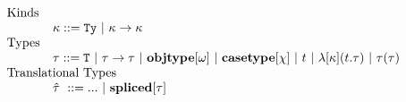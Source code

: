 \begin{figure}[ht]
\[
	\begin{array}{llcl}
      \text{Kinds}\\
      ~~~~~~~~~~~	\kappa ::=  \mathtt{Ty}  ~|~ \kappa \rightarrow \kappa\\
      \text{Types}\\
      ~~~~~~~~~~~	 \tau  ::=  \mathtt{T} ~|~ \tau \rightarrow \tau ~|~ \mathbf{objtype}[\omega] ~|~ \mathbf{casetype}[\chi] ~|~  t ~|~ \lambda[\kappa](t.\tau) ~|~ \tau(\tau) \\
      \text{Translational Types}\\
      ~~~~~~~~~~~\hat{\tau} ~ ::= ... ~|~ \mathbf{spliced}[\tau]
  \end{array}
\]
\label{syntax-types}
\end{figure}